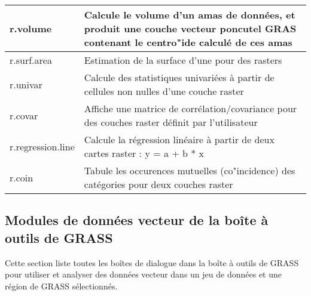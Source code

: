 \begin{table}[ht]
\begin{tabular}{|p{4cm}|p{12cm}|}
  \hline r.volume & Calcule le volume d'un amas de donn\'ees, et produit une couche vecteur poncutel GRAS contenant le centro"ide calcul\'e de ces amas \\
  \hline r.surf.area & Estimation de la surface d'une pour des rasters \\
  \hline r.univar & Calcule des statistiques univari\'ees \`a partir de cellules non nulles d'une couche raster\\
  \hline r.covar & Affiche une matrice de corr\'elation/covariance pour des couches raster d\'efinit par l'utilisateur\\
  \hline r.regression.line & Calcule la r\'egression lin\'eaire \`a partir de deux cartes raster : y = a + b * x \\
  \hline r.coin & Tabule les occurences mutuelles (co"incidence) des cat\'egories pour deux couches raster\\
\hline
\end{tabular}
\end{table}

\clearpage

\subsection{Modules de donn\'ees vecteur de la bo\^ite \`a outils de GRASS}

Cette section liste toutes les bo\^ites de dialogue dans la bo\^ite \`a outils de GRASS pour utiliser et analyser des donn\'ees vecteur dans un jeu de donn\'ees et une r\'egion de GRASS s\'electionn\'es.

